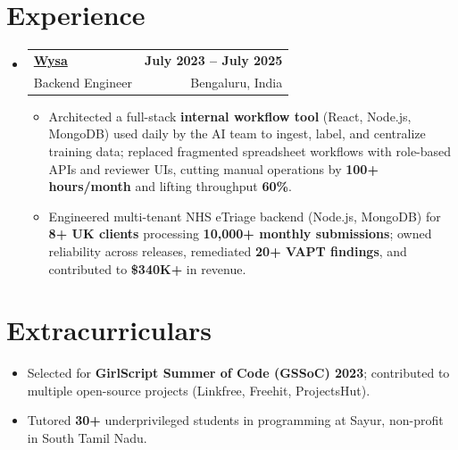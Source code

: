 \documentclass[letterpaper,10pt]{article}
\makeatletter
\newcommand{\resumeItem}[1]{
  \item\small{#1\vspace{-1pt}}
}
\newcommand{\resumeSubheading}[4]{
  \vspace{1pt}\item
    \begin{tabular*}{0.985\textwidth}[t]{l@{\extracolsep{\fill}}r}
      \textbf{#1} & \textbf{\small #2} \\
      {\small\color{ResumeSlate} #3} & {\small\color{ResumeSlate} #4} \\
    \end{tabular*}\vspace{-6pt}
}
\newcommand{\resumeSubHeadingListStart}{\begin{itemize}[leftmargin=0.0in, label={}, itemsep=2pt, topsep=2pt]}
\newcommand{\resumeSubHeadingListEnd}{\end{itemize}}
\newcommand{\resumeItemListStart}{\begin{itemize}[leftmargin=0.18in, itemsep=2pt, topsep=1pt]}
\newcommand{\resumeItemListEnd}{\end{itemize}\vspace{-4pt}}
\makeatother
\begin{document}
\section{Experience}
\resumeSubHeadingListStart
  \resumeSubheading
    {\href{https://www.wysa.io}{Wysa}}{July 2023 -- July 2025}
    {Backend Engineer}{Bengaluru, India}
    \resumeItemListStart
      \resumeItem{Architected a full-stack \textbf{internal workflow tool} (React, Node.js, MongoDB) used daily by the AI team to ingest, label, and centralize training data; replaced fragmented spreadsheet workflows with role-based APIs and reviewer UIs, cutting manual operations by \textbf{100+ hours/month} and lifting throughput \textbf{60\%}.}
      \resumeItem{Engineered multi-tenant NHS eTriage backend (Node.js, MongoDB) for \textbf{8+ UK clients} processing \textbf{10{,}000+ monthly submissions}; owned reliability across releases, remediated \textbf{20+ VAPT findings}, and contributed to \textbf{\$340K+} in revenue.}
    \resumeItemListEnd
\resumeSubHeadingListEnd
\vspace{-4pt}
\section{Extracurriculars}
\begin{itemize}[leftmargin=0.18in, itemsep=0pt, topsep=1pt]
  \item\small Selected for \textbf{GirlScript Summer of Code (GSSoC) 2023}; contributed to multiple open-source projects (Linkfree, Freehit, ProjectsHut).
  \item\small Tutored \textbf{30+} underprivileged students in programming at Sayur, non-profit in South Tamil Nadu.
\end{itemize}
\vspace{-6pt}
\end{document}
